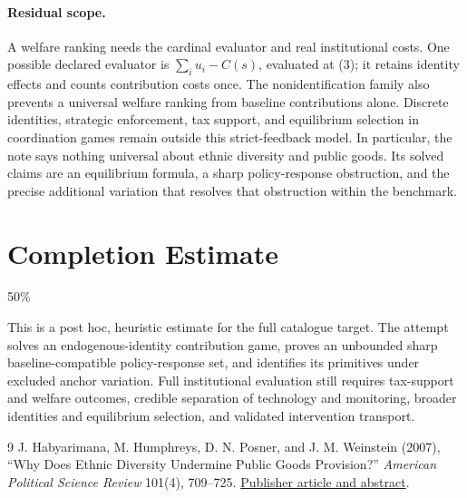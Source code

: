 \documentclass[11pt]{article}
\theoremstyle{definition}
\begin{document}
\paragraph{Residual scope.}
A welfare ranking needs the cardinal evaluator and real institutional costs. One possible declared evaluator is $\sum_i u_i-C(s)$, evaluated at (3); it retains identity effects and counts contribution costs once. The nonidentification family also prevents a universal welfare ranking from baseline contributions alone. Discrete identities, strategic enforcement, tax support, and equilibrium selection in coordination games remain outside this strict-feedback model. In particular, the note says nothing universal about ethnic diversity and public goods. Its solved claims are an equilibrium formula, a sharp policy-response obstruction, and the precise additional variation that resolves that obstruction within the benchmark.

\section{Completion Estimate}
50\%

This is a post hoc, heuristic estimate for the full catalogue target.
The attempt solves an endogenous-identity contribution game, proves an unbounded sharp baseline-compatible policy-response set, and identifies its primitives under excluded anchor variation. Full institutional evaluation still requires tax-support and welfare outcomes, credible separation of technology and monitoring, broader identities and equilibrium selection, and validated intervention transport.

\begin{thebibliography}{9}
 J. Habyarimana, M. Humphreys, D. N. Posner, and J. M. Weinstein (2007), ``Why Does Ethnic Diversity Undermine Public Goods Provision?'' \emph{American Political Science Review} 101(4), 709--725. \href{https://www.cambridge.org/core/journals/american-political-science-review/article/abs/why-does-ethnic-diversity-undermine-public-goods-provision/36C285D07DC0DE604BFC123F53060DF6}{Publisher article and abstract}.
\end{thebibliography}
\end{document}
